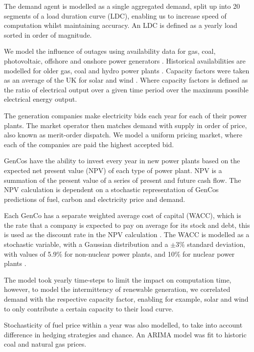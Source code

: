The demand agent is modelled as a single aggregated demand, split up into 20 segments of a load duration curve (LDC), enabling us to increase speed of computation whilst maintaining accuracy. An LDC is defined as a yearly load sorted in order of magnitude. 

We model the influence of outages using availability data for gas, coal, photovoltaic, offshore and onshore power generators \cite{Ltd2016, Hunt2015, carroll-j}. Historical availabilities are modelled for older gas, coal and hydro power plants \cite{AlbertaSystemElectricOperator2016}. Capacity factors were taken as an average of the UK for solar and wind \cite{Pfenninger2016, Staffell2016}. Where capacity factors is defined as the ratio of electrical output over a given time period over the maximum possible electrical energy output. 

The generation companies make electricity bids each year for each of their power plants. The market operator then matches demand with supply in order of price, also known as merit-order dispatch. We model a uniform pricing market, where each of the companies are paid the highest accepted bid.

GenCos have the ability to invest every year in new power plants based on the expected net present value (NPV) of each type of power plant. NPV is a summation of the present value of a series of present and future cash flow. The NPV calculation is dependent on a stochastic representation of GenCos predictions of fuel, carbon and electricity price and demand.

Each GenCo has a separate weighted average cost of capital (WACC), which is the rate that a company is expected to pay on average for its stock and debt, this is used as the discount rate in the NPV calculation \cite{KincheloeStephenC1990TWAC}. The WACC is modelled as a stochastic variable, with a Gaussian distribution and a $\pm3\%$ standard deviation, with values of 5.9\% for non-nuclear power plants, and 10\% for nuclear power plants \cite{KPMG2017, Paper2012}. 

The model took yearly time-steps to limit the impact on computation time, however, to model the intermittency of renewable generation, we correlated demand with the respective capacity factor, enabling for example, solar and wind to only contribute a certain capacity to their load curve.

Stochasticity of fuel price within a year was also modelled, to take into account difference in hedging strategies and chance. An ARIMA model \cite{ARIMA} was fit to historic coal and natural gas prices.



